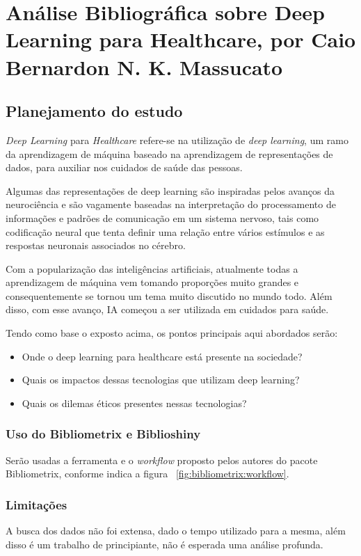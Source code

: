 \chapter{Análise Bibliográfica sobre Deep Learning para Healthcare, por Caio Bernardon N. K. Massucato\label{chap:bibliometria:CaioMassucato}}

\section{Planejamento do estudo}

\textit{Deep Learning} para \textit{Healthcare} refere-se na utilização de \textit{deep learning}, um ramo da aprendizagem de máquina baseado na aprendizagem de representações de dados, para auxiliar nos cuidados de saúde das pessoas.

Algumas das representações de deep learning são inspiradas pelos avanços da neurociência e são vagamente baseadas na interpretação do processamento de informações e padrões de comunicação em um sistema nervoso, tais como codificação neural que tenta definir uma relação entre vários estímulos e as respostas neuronais associados no cérebro.

Com a popularização das inteligências artificiais, atualmente todas a aprendizagem de máquina vem tomando proporções muito grandes e consequentemente se tornou um tema muito discutido no mundo todo. Além disso, com esse avanço, IA começou a ser utilizada em cuidados para saúde.

Tendo como base o exposto acima, os pontos principais aqui abordados serão:
\begin{itemize}
    \item Onde o deep learning para healthcare está presente na sociedade?
    \item Quais os impactos dessas tecnologias que utilizam deep learning?
    \item Quais os dilemas éticos presentes nessas tecnologias?
\end{itemize}

\subsection{Uso do Bibliometrix e Biblioshiny}
Serão usadas a ferramenta e o \textit{workflow} proposto pelos autores do pacote Bibliometrix, conforme indica a figura ~\ref{fig:bibliometrix:workflow}.

\subsection{Limitações} A busca dos dados não foi extensa, dado o tempo utilizado para a mesma, além disso é um trabalho de principiante, não é esperada uma análise profunda.


